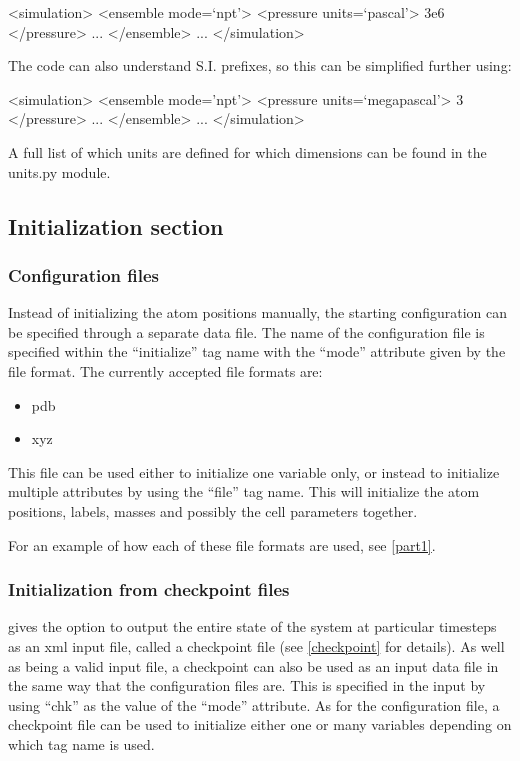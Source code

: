 \documentclass[11pt,english,fleqn]{report}
\newenvironment{code}{%
\footnotesize 
\verbatim
}{
\endverbatim
\normalsize
}
\begin{document}
\begin{code}
<simulation>
   <ensemble mode=`npt'>
      <pressure units=`pascal'> 3e6 </pressure>
      ...
   </ensemble>
   ...
</simulation>
\end{code}

The code can also understand S.I. prefixes, so this can be simplified
further using:

\begin{code}
<simulation>
   <ensemble mode='npt'>
      <pressure units=`megapascal'> 3 </pressure>
      ...
   </ensemble>
   ...
</simulation>
\end{code}

A full list of which units are defined for which dimensions
can be found in the units.py module.


\subsection{Initialization section}


\subsubsection{Configuration files}

\label{configfile}

Instead of initializing the atom positions manually, the starting
configuration can be specified through a separate data file. The name
of the configuration file is specified within the {}``initialize''
tag name with the {}``mode'' attribute given by the file format.
The currently accepted file formats are:
\begin{itemize}
\item pdb
\item xyz
\end{itemize}
This file can be used either to initialize one variable only, or instead
to initialize multiple attributes by using the {}``file'' tag name.
This will initialize the atom positions, labels, masses and possibly
the cell parameters together.

For an example of how each of these file formats are used, see
\ref{part1}.


\subsubsection{Initialization from checkpoint files}

\ipi gives the option to output the entire state of the system at
particular timesteps as an xml input file, called a checkpoint file
(see \ref{checkpoint} for details). As well as being a valid input
file, a checkpoint can also be used as an input data file in the same
way that the configuration files are. This is specified in the input
by using {}``chk'' as the value of the {}``mode'' attribute. As
for the configuration file, a checkpoint file can be used to initialize
either one or many variables depending on which tag name is used.
\end{document}
